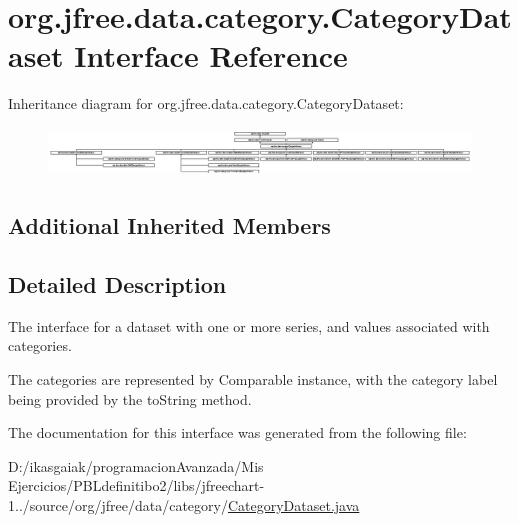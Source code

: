 \hypertarget{interfaceorg_1_1jfree_1_1data_1_1category_1_1_category_dataset}{}\section{org.\+jfree.\+data.\+category.\+Category\+Dataset Interface Reference}
\label{interfaceorg_1_1jfree_1_1data_1_1category_1_1_category_dataset}
Inheritance diagram for org.\+jfree.\+data.\+category.\+Category\+Dataset\+:\begin{figure}[H]
\begin{center}
\leavevmode
\includegraphics[height=1.306667cm]{interfaceorg_1_1jfree_1_1data_1_1category_1_1_category_dataset}
\end{center}
\end{figure}
\subsection*{Additional Inherited Members}


\subsection{Detailed Description}
The interface for a dataset with one or more series, and values associated with categories. 

The categories are represented by {\ttfamily Comparable} instance, with the category label being provided by the {\ttfamily to\+String} method. 

The documentation for this interface was generated from the following file\+:\begin{DoxyCompactItemize}
\item 
D\+:/ikasgaiak/programacion\+Avanzada/\+Mis Ejercicios/\+P\+B\+Ldefinitibo2/libs/jfreechart-\/1../source/org/jfree/data/category/\mbox{\hyperlink{_category_dataset_8java}{Category\+Dataset.\+java}}\end{DoxyCompactItemize}
